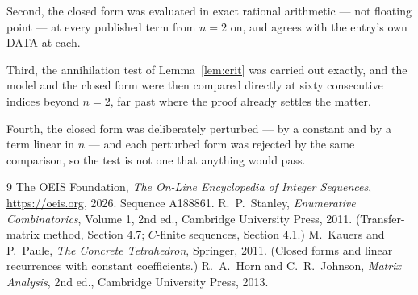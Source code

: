 \documentclass[11pt,a4paper]{article}
\theoremstyle{plain}
\theoremstyle{definition}
\begin{document}
Second, the closed form was evaluated in exact rational arithmetic --- not floating point ---
at every published term from $n=2$ on, and agrees with the entry's own DATA at each.

Third, the annihilation test of Lemma~\ref{lem:crit} was carried out exactly, and the model
and the closed form were then compared directly at sixty consecutive indices beyond
$n=2$, far past where the proof already settles the matter.

Fourth, the closed form was deliberately perturbed --- by a constant and by a term linear in
$n$ --- and each perturbed form was rejected by the same comparison, so the test is not one
that anything would pass.

\begin{thebibliography}{9}
 The OEIS Foundation, \emph{The On-Line Encyclopedia of Integer
Sequences}, \url{https://oeis.org}, 2026. Sequence A188861.
 R.~P.~Stanley, \emph{Enumerative Combinatorics}, Volume 1, 2nd ed.,
Cambridge University Press, 2011. (Transfer-matrix method, Section 4.7; $C$-finite sequences,
Section 4.1.)
 M.~Kauers and P.~Paule, \emph{The Concrete Tetrahedron}, Springer, 2011.
(Closed forms and linear recurrences with constant coefficients.)
 R.~A.~Horn and C.~R.~Johnson, \emph{Matrix Analysis}, 2nd ed., Cambridge
University Press, 2013.
\end{thebibliography}
\end{document}
